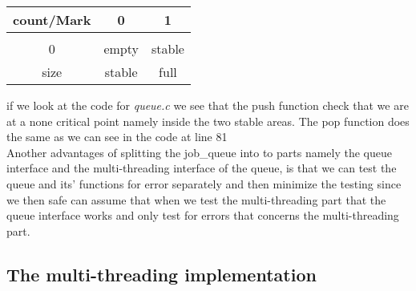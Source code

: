 \begin{center}
	\begin{tabular}{c|c|c|}
	 count/Mark 	& 		0	& 	1		\\\hline\\
	 	0		& 	empty  	&  	stable	\\\hline
	    size  	&   stable 	&	full		\\\hline 	
	\end{tabular}
\end{center}
if we look at the code for \textit{queue.c} we see that the push function check that we are at a none critical point namely inside the two stable areas. The pop function does the same as we can see in the code at line 81 \\

Another advantages of splitting the job_queue into to parts namely the queue interface and the multi-threading interface of the queue, is that we can test the queue and its' functions for error separately and then minimize the testing since we then safe can assume that when we test the multi-threading part that the queue interface works and only test for errors that concerns the multi-threading part.
\\[10pt]
\subsection{The multi-threading implementation}

